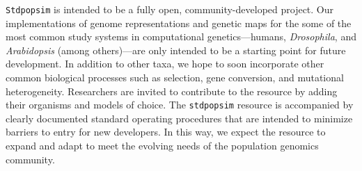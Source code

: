 \documentclass[12pt,halfline,a4paper]{ouparticle}
\newcommand{\Stdpopsim}{\texttt{Stdpopsim}\xspace}
\newcommand{\stdpopsim}{\texttt{stdpopsim}\xspace}
\newcommand{\dadi}{$\partial a \partial i$\xspace}
\newcommand{\MSMC}{\texttt{MSMC}\xspace}
\newcommand{\adk}[1]{\textcolor{red}{ADK: #1}}
\begin{document}
\Stdpopsim is intended to be a fully open, community-developed project.
Our implementations of genome representations and genetic maps for the some of
the most common study systems in computational genetics---humans, \textit{Drosophila},
and \textit{Arabidopsis} (among others)---are only intended to be a starting point for
future development.  In addition to other taxa,
we hope to soon incorporate other common biological processes
such as selection, gene conversion, and mutational heterogeneity.
Researchers are invited to contribute to the resource by adding their
organisms and models of choice. The \stdpopsim resource is
accompanied by clearly documented standard operating procedures that are
intended to minimize barriers to entry for new developers.  In this way, we
expect the resource to expand and adapt to meet the evolving needs of the
population genomics community.


\end{document}
